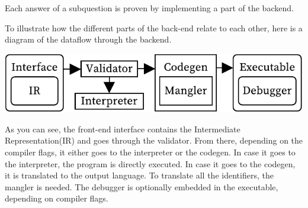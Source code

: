Each answer of a subquestion is proven by implementing a part of the backend. 

To illustrate how the different parts of the back-end relate to each other, here is a diagram of the dataflow through the backend.

\includegraphics[width=\columnwidth]{overview}

As you can see, the front-end interface contains the Intermediate Representation(IR) and goes through the validator.
From there, depending on the compiler flags, it either goes to the interpreter or the codegen.
In case it goes to the interpreter, the program is directly executed.
In case it goes to the codegen, it is translated to the output language.
To translate all the identifiers, the mangler is needed.
The debugger is optionally embedded in the executable, depending on compiler flags.

